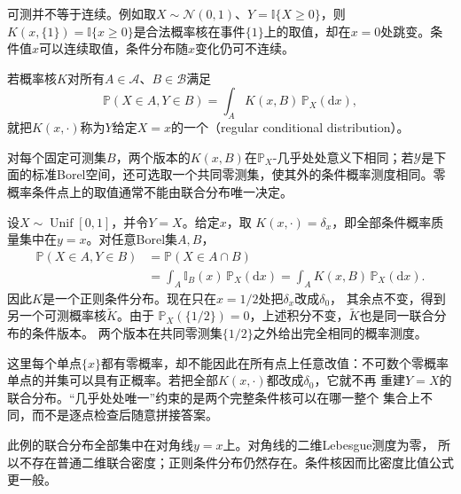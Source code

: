 可测并不等于连续。例如取\(X\sim\mathcal N(0,1)\)、\(Y=\mathbb I\{X\geq0\}\)，则\(K(x,\{1\})=\mathbb I\{x\geq0\}\)是合法概率核在事件\(\{1\}\)上的取值，却在\(x=0\)处跳变。条件值\(x\)可以连续取值，条件分布随\(x\)变化仍可不连续。

\begin{definition}[正则条件分布]
  \label{def:probability-regular-conditional-distribution}
若概率核\(K\)对所有\(A\in\mathcal A\)、\(B\in\mathcal B\)满足
\begin{equation}
  \mathbb{P}(X\in A,Y\in B)
  =
  \int_A K(x,B)\,\mathbb{P}_X(\mathrm{d}x),
  \label{eq:probability-regular-conditional-kernel}
\end{equation}
就把\(K(x,\cdot)\)称为\(Y\)给定\(X=x\)的一个（regular conditional distribution）。
\end{definition}
对每个固定可测集\(B\)，两个版本的\(K(x,B)\)在\(\mathbb P_X\)-几乎处处意义下相同；若\(\mathcal Y\)是下面的标准Borel空间，还可选取一个共同零测集，使其外的条件概率测度相同。零概率条件点上的取值通常不能由联合分布唯一决定。

\begin{example}[条件分布版本可以怎样不同]
\label{ex:probability-conditional-kernel-versions}
设\(X\sim\operatorname{Unif}[0,1]\)，并令\(Y=X\)。给定\(x\)，取
\(K(x,\cdot)=\delta_x\)，即全部条件概率质量集中在\(y=x\)。对任意Borel集\(A,B\)，
\[
 \begin{aligned}
 \mathbb P(X\in A,Y\in B)
 &=\mathbb P(X\in A\cap B)\\
 &=\int_A\mathbb I_B(x)\,\mathbb P_X(\mathrm dx)
  =\int_A K(x,B)\,\mathbb P_X(\mathrm dx).
 \end{aligned}
\]
因此\(K\)是一个正则条件分布。现在只在\(x=1/2\)处把\(\delta_x\)改成\(\delta_0\)，
其余点不变，得到另一个可测概率核\(\widetilde K\)。由于
\(\mathbb P_X(\{1/2\})=0\)，上述积分不变，\(\widetilde K\)也是同一联合分布的条件版本。
两个版本在共同零测集\(\{1/2\}\)之外给出完全相同的概率测度。

这里每个单点\(\{x\}\)都有零概率，却不能因此在所有点上任意改值：不可数个零概率
单点的并集可以具有正概率。若把全部\(K(x,\cdot)\)都改成\(\delta_0\)，它就不再
重建\(Y=X\)的联合分布。“几乎处处唯一”约束的是两个完整条件核可以在哪一整个
集合上不同，而不是逐点检查后随意拼接答案。

此例的联合分布全部集中在对角线\(y=x\)上。对角线的二维Lebesgue测度为零，
所以不存在普通二维联合密度；正则条件分布仍然存在。条件核因而比密度比值公式更一般。
\end{example}


